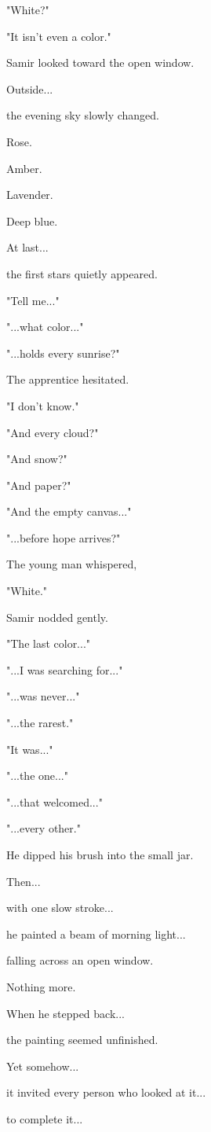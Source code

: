 \documentclass[12pt,openany]{book}
\begin{document}
"White?"

"It isn't even a color."

Samir looked toward the open window.

Outside...

the evening sky slowly changed.

Rose.

Amber.

Lavender.

Deep blue.

At last...

the first stars quietly appeared.

"Tell me..."

"...what color..."

"...holds every sunrise?"

The apprentice hesitated.

"I don't know."

"And every cloud?"

"And snow?"

"And paper?"

"And the empty canvas..."

"...before hope arrives?"

The young man whispered,

"White."

Samir nodded gently.

"The last color..."

"...I was searching for..."

"...was never..."

"...the rarest."

"It was..."

"...the one..."

"...that welcomed..."

"...every other."

He dipped his brush into the small jar.

Then...

with one slow stroke...

he painted a beam of morning light...

falling across an open window.

Nothing more.

When he stepped back...

the painting seemed unfinished.

Yet somehow...

it invited every person who looked at it...

to complete it...
\end{document}
